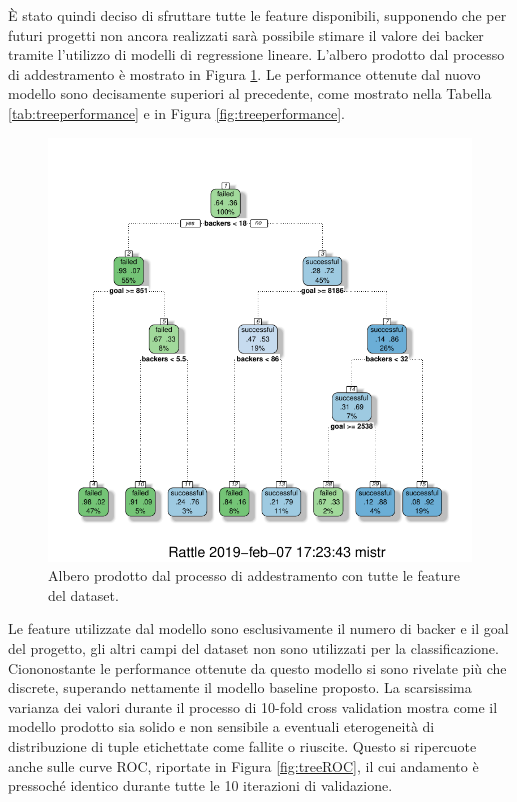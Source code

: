 \newpage
È stato quindi deciso di sfruttare tutte le feature disponibili, supponendo che per futuri progetti non ancora realizzati sarà possibile stimare il valore dei backer tramite l'utilizzo di modelli di regressione lineare. L'albero prodotto dal processo di addestramento è mostrato in Figura \ref{fig:tree}. Le performance ottenute dal nuovo modello sono decisamente superiori al precedente, come mostrato nella Tabella \ref{tab:treeperformance} e in Figura \ref{fig:treeperformance}.\\
\begin{figure}
	\centering
	\includegraphics[width=0.9\linewidth]{../FinalResults/tree}
	\caption{Albero prodotto dal processo di addestramento con tutte le feature del dataset.}
	\label{fig:tree}
\end{figure}
Le feature utilizzate dal modello sono esclusivamente il numero di backer e il goal del progetto, gli altri campi del dataset non sono utilizzati per la classificazione. Ciononostante le performance ottenute da questo modello si sono rivelate più che discrete, superando nettamente il modello baseline proposto. La scarsissima varianza dei valori durante il processo di 10-fold cross validation mostra come il modello prodotto sia solido e non sensibile a eventuali eterogeneità di distribuzione di tuple etichettate come fallite o riuscite. Questo si ripercuote anche sulle curve ROC, riportate in Figura \ref{fig:treeROC}, il cui andamento è pressoché identico durante tutte le 10 iterazioni di validazione.

